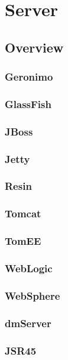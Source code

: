 \part{Server}


\chapter{Overview}



\section{Geronimo}



\section{GlassFish}



\section{JBoss}


\section{Jetty}


\section{Resin}



\section{Tomcat}



\section{TomEE}



\section{WebLogic}



\section{WebSphere}



\section{dmServer}



\section{JSR45}










